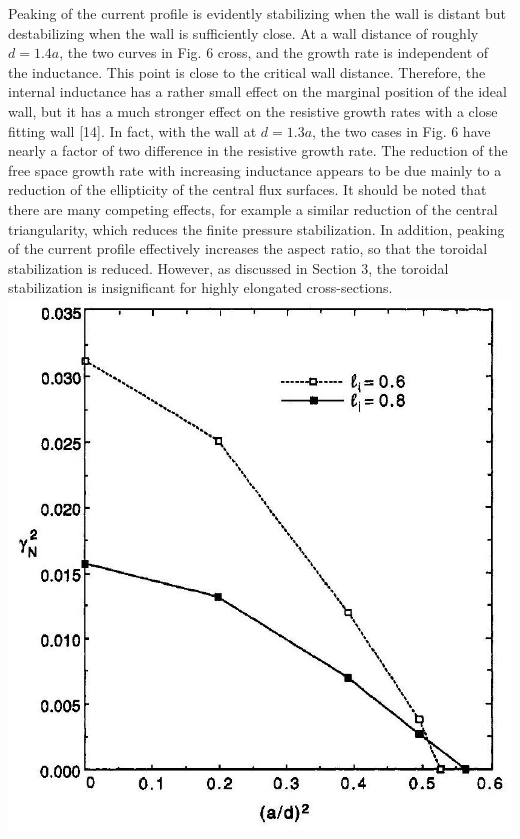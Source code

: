 \documentclass[10pt]{article}
\begin{document}
Peaking of the current profile is evidently stabilizing when the wall is distant but destabilizing when the wall is sufficiently close. At a wall distance of roughly $d=1.4 a$, the two curves in Fig. 6 cross, and the growth rate is independent of the inductance. This point is close to the critical wall distance. Therefore, the internal inductance has a rather small effect on the marginal position of the ideal wall, but it has a much stronger effect on the resistive growth rates with a close fitting wall [14]. In fact, with the wall at $d=1.3 a$, the two cases in Fig. 6 have nearly a factor of two difference in the resistive growth rate. The reduction of the free space growth rate with increasing inductance appears to be due mainly to a reduction of the ellipticity of the central flux surfaces. It should be noted that there are many competing effects, for example a similar reduction of the central triangularity, which reduces the finite pressure stabilization. In addition, peaking of the current profile effectively increases the aspect ratio, so that the toroidal stabilization is reduced. However, as discussed in Section 3, the toroidal stabilization is insignificant for highly elongated cross-sections.\\
\includegraphics[max width=\textwidth, center]{2025_01_10_a0135324997886412d98g-7}
\end{document}
